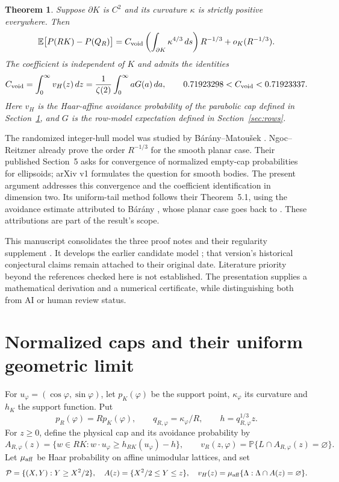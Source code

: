 \documentclass[11pt,a4paper]{article}
\newcommand{\E}{\mathbb E}\newcommand{\Prob}{\mathbb P}
\newcommand{\Pcal}{\mathcal P}\newcommand{\Hrow}{\mathcal H}
\newtheorem{theorem}{Theorem}\newtheorem{proposition}{Proposition}
\theoremstyle{remark}\newtheorem{remark}{Remark}
\numberwithin{equation}{section}
\begin{document}
\begin{theorem}\label{thm:main}
Suppose $\partial K$ is $C^2$ and its curvature $\kappa$ is strictly positive everywhere. Then
\begin{equation}\label{eq:main}
 \E\bigl[P(RK)-P(Q_R)\bigr]
 =\Cvoid\left(\int_{\partial K}\kappa^{4/3}\,ds\right)R^{-1/3}
 +o_K(R^{-1/3}).
\end{equation}
The coefficient is independent of $K$ and admits the identities
\begin{equation}\label{eq:constant}
 C_{\mathrm{void}}=\int_0^\infty v_H(z)\,dz
 =\frac1{\zeta(2)}\int_0^\infty aG(a)\,da,
 \qquad 0.71923298<C_{\mathrm{void}}<0.71923337.
\end{equation}
Here $v_H$ is the Haar-affine avoidance probability of the parabolic cap defined in Section~\ref{sec:caps}, and $G$ is the row-model expectation defined in Section~\ref{sec:rows}.
\end{theorem}

The randomized integer-hull model was studied by Bárány--Matoušek \cite{BM}. Ngoc--Reitzner \cite{NR} already prove the order $R^{-1/3}$ for the smooth planar case. Their published Section~5 asks for convergence of normalized empty-cap probabilities for ellipsoids; arXiv v1 formulates the question for smooth bodies. The present argument addresses this convergence and the coefficient identification in dimension two. Its uniform-tail method follows their Theorem~5.1, using the avoidance estimate attributed to Bárány \cite{B}, whose planar case goes back to \cite{BM}. These attributions are part of the result's scope.

This manuscript consolidates the three proof notes and their regularity supplement \cite{CV,QU,ID,CA}. It develops the earlier candidate model \cite{M2}; that version's historical conjectural claims remain attached to their original date. Literature priority beyond the references checked here is not established. The presentation supplies a mathematical derivation and a numerical certificate, while distinguishing both from AI or human review status.

\section{Normalized caps and their uniform geometric limit}\label{sec:caps}
For $u_\varphi=(\cos\varphi,\sin\varphi)$, let $p_K(\varphi)$ be the support point, $\kappa_\varphi$ its curvature and $h_K$ the support function. Put
\[
 p_R(\varphi)=Rp_K(\varphi),\qquad q_{R,\varphi}=\kappa_\varphi/R,
 \qquad h=q_{R,\varphi}^{1/3}z.
\]
For $z\ge0$, define the physical cap and its avoidance probability by
\begin{equation}\label{eq:caps}
 A_{R,\varphi}(z)=\{w\in RK:w\cdot u_\varphi\ge h_{RK}(u_\varphi)-h\},
 \qquad v_R(z,\varphi)=\Prob\{L\cap A_{R,\varphi}(z)=\varnothing\}.
\end{equation}
Let $\mu_{\rm aff}$ be Haar probability on affine unimodular lattices, and set
\begin{equation}\label{eq:parabola}
 \Pcal=\{(X,Y):Y\ge X^2/2\},\quad A(z)=\{X^2/2\le Y\le z\},
 \quad v_H(z)=\mu_{\rm aff}\{\Lambda:\Lambda\cap A(z)=\varnothing\}.
\end{equation}
\end{document}
